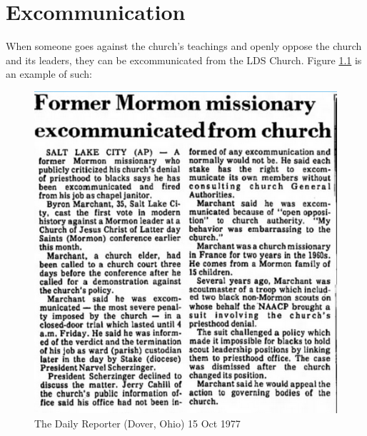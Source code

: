 \chapter{Excommunication}

When someone goes against the church's teachings and openly oppose the church and its
leaders, they can be excommunicated from the LDS Church. Figure \ref{fig:ex1} is an example
of such:

\begin{figure}[h!]
  \centering
  \includegraphics[width=0.4\linewidth]{articles/images/ex.png}
  \caption{The Daily Reporter (Dover, Ohio) 15 Oct 1977}
  \label{fig:ex1}
\end{figure}

